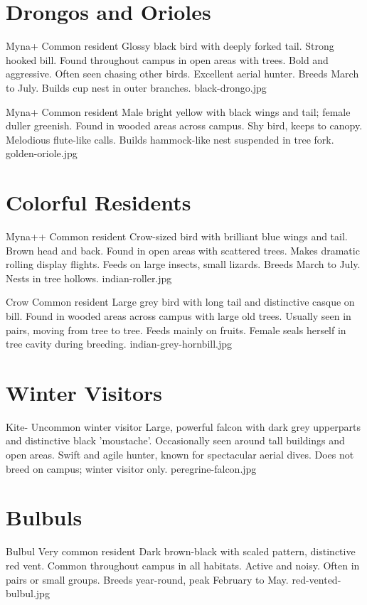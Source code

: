 \documentclass[aspectratio=169]{beamer}
\begin{document}
\section{Drongos and Orioles}
{Myna+}
{Common resident}
{Glossy black bird with deeply forked tail. Strong hooked bill.}
{Found throughout campus in open areas with trees.}
{Bold and aggressive. Often seen chasing other birds. Excellent aerial hunter.}
{Breeds March to July. Builds cup nest in outer branches.}
{black-drongo.jpg}

{Myna+}
{Common resident}
{Male bright yellow with black wings and tail; female duller greenish.}
{Found in wooded areas across campus.}
{Shy bird, keeps to canopy. Melodious flute-like calls.}
{Builds hammock-like nest suspended in tree fork.}
{golden-oriole.jpg}

\section{Colorful Residents}
{Myna++}
{Common resident}
{Crow-sized bird with brilliant blue wings and tail. Brown head and back.}
{Found in open areas with scattered trees.}
{Makes dramatic rolling display flights. Feeds on large insects, small lizards.}
{Breeds March to July. Nests in tree hollows.}
{indian-roller.jpg}

{Crow}
{Common resident}
{Large grey bird with long tail and distinctive casque on bill.}
{Found in wooded areas across campus with large old trees.}
{Usually seen in pairs, moving from tree to tree. Feeds mainly on fruits.}
{Female seals herself in tree cavity during breeding.}
{indian-grey-hornbill.jpg}

\section{Winter Visitors}
{Kite-}
{Uncommon winter visitor}
{Large, powerful falcon with dark grey upperparts and distinctive black 'moustache'.}
{Occasionally seen around tall buildings and open areas.}
{Swift and agile hunter, known for spectacular aerial dives.}
{Does not breed on campus; winter visitor only.}
{peregrine-falcon.jpg}

\section{Bulbuls}
{Bulbul}
{Very common resident}
{Dark brown-black with scaled pattern, distinctive red vent.}
{Common throughout campus in all habitats.}
{Active and noisy. Often in pairs or small groups.}
{Breeds year-round, peak February to May.}
{red-vented-bulbul.jpg}
\end{document}
